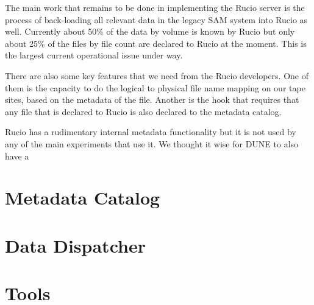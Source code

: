 The main work that remains to be done in implementing the Rucio server is the process of back-loading all relevant 
data in the legacy SAM system into Rucio as well.  Currently about 50\% of the data by volume is known by Rucio but only about 25\% of the files by file count are declared to Rucio at the moment.  This is the largest current 
operational issue under way.

There are also some key features that we need from the Rucio developers.  One of them is the capacity to 
do the logical to physical file name mapping on our tape sites, based on the metadata of the file.  Another
is the hook that requires that any file that is declared to Rucio is also declared to the metadata catalog.

Rucio has a rudimentary internal metadata functionality but it is not used by any of the main 
experiments that use it.  We thought it wise for DUNE to also have a 
\section{Metadata Catalog}



\section{Data Dispatcher}

\section{Tools}


